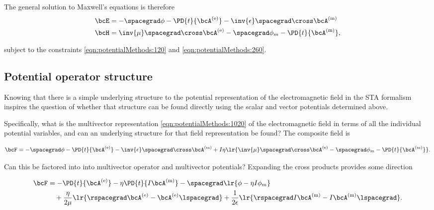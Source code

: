 The general solution to Maxwell's equations is therefore
\begin{equation}\label{eqn:potentialMethods:280}
\begin{aligned}
\bcE &=
-\spacegrad \phi -\PD{t}{ \bcA^\e }
- \inv{\epsilon} \spacegrad \cross \bcA^\m \\
\bcH &=
\inv{\mu} \spacegrad \cross \bcA^\e
-\spacegrad \phi_m - \PD{t}{\bcA^\m},
\end{aligned}
\end{equation}

subject to the constraints \cref{eqn:potentialMethods:120} and \cref{eqn:potentialMethods:260}.

\subsection{Potential operator structure}

Knowing that there is a simple underlying structure to the potential representation of the electromagnetic field in the STA formalism inspires the question of whether that structure can be found directly using the scalar and vector potentials determined above.

Specifically, what is the multivector representation \cref{eqn:potentialMethods:1020} of the electromagnetic field in terms of all the individual potential variables, and can an underlying structure for that field representation be found?  The composite field is

\begin{equation}\label{eqn:potentialMethods:280b}
\bcF
=
-\spacegrad \phi -\PD{t}{ \bcA^\e }
- \inv{\epsilon} \spacegrad \cross \bcA^\m \\
+ I \eta
\lr{
\inv{\mu} \spacegrad \cross \bcA^\e
-\spacegrad \phi_m - \PD{t}{\bcA^\m}
}.
\end{equation}

Can this be factored into into multivector operator and multivector potentials?  Expanding the cross products provides some direction

\begin{equation}\label{eqn:potentialMethods:1040}
\begin{aligned}
\bcF
&=
- \PD{t}{ \bcA^\e }
- \eta \PD{t}{I \bcA^\m}
- \spacegrad \lr{ \phi - \eta I \phi_m } \\
&\quad + \frac{\eta}{2 \mu} \lr{ \rspacegrad \bcA^\e - \bcA^\e \lspacegrad }
+ \frac{1}{2 \epsilon} \lr{ \rspacegrad I \bcA^\m - I \bcA^\m \lspacegrad }.
\end{aligned}
\end{equation}

